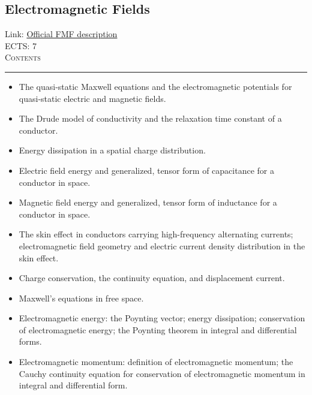 \documentclass[11pt, a4paper]{article}
\newenvironment{course}[3]{
\subsection{#1}%
Link: \href{#2}{Official FMF description}\\%
ECTS: #3%
\vspace{1ex}
\\
{\large \textsc{Contents}}\\[-0.9ex]%
\rule{\textwidth}{0.5pt}
\vspace{-3ex}
}
{}
\newenvironment{chapter}[1]{
\begin{tcolorbox}[title=#1, breakable]
}
{\end{tcolorbox}}
\begin{document}
\begin{course}{Electromagnetic Fields}{https://www.fmf.uni-lj.si/en/study-physics/programmes/1fiz/2020/7000777/courses/1133/}{7}
\begin{chapter}{Quasi-static electromagnetic fields}
\begin{itemize}
            \item The quasi-static Maxwell equations and the electromagnetic potentials for quasi-static electric and magnetic fields.

        \end{itemize}
    \end{chapter}

    \begin{chapter}{Conductors and Ohm's law}
        \begin{itemize}
        
            \item The Drude model of conductivity and the relaxation time constant of a conductor.

            \item Energy dissipation in a spatial charge distribution.

            \item Electric field energy and generalized, tensor form of capacitance for a conductor in space.

            \item Magnetic field energy and generalized, tensor form of inductance for a conductor in space.

            \item The skin effect in conductors carrying high-frequency alternating currents; electromagnetic field geometry and electric current density distribution in the skin effect.
        
        \end{itemize}
    \end{chapter}

    \begin{chapter}{Maxwell's equations in free space}
        \begin{itemize}
        
            \item Charge conservation, the continuity equation, and displacement current.

            \item Maxwell's equations in free space.

            \item Electromagnetic energy: the Poynting vector; energy dissipation; conservation of electromagnetic energy; the Poynting theorem in integral and differential forms.

            \item Electromagnetic momentum: definition of electromagnetic momentum; the Cauchy continuity equation for conservation of electromagnetic momentum in integral and differential form.


\end{itemize}
\end{chapter}
\end{course}
\end{document}
